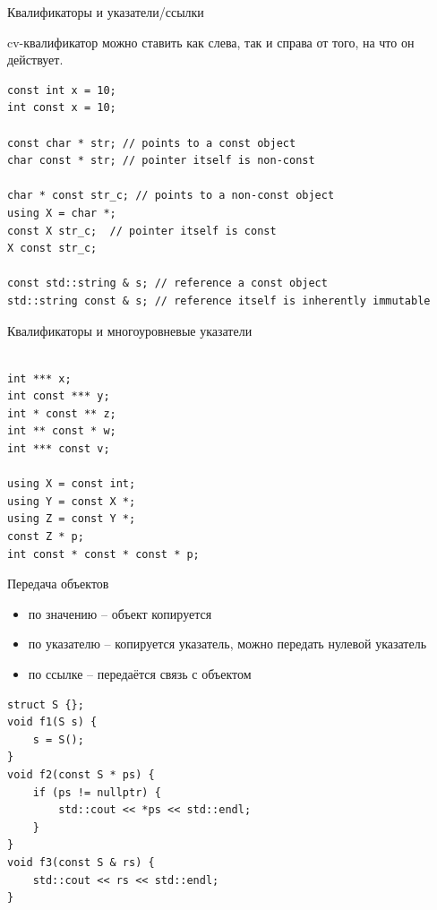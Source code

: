 \documentclass[unknownkeysallowed,xcolor=table]{beamer}
\begin{document}
\begin{frame}[fragile]{Квалификаторы и указатели/ссылки}

cv-квалификатор можно ставить как слева, так и справа от того, на что он действует.

\vspace{1em}

\begin{lstlisting}
const int x = 10;
int const x = 10;

const char * str; // points to a const object
char const * str; // pointer itself is non-const

char * const str_c; // points to a non-const object
using X = char *;
const X str_c;  // pointer itself is const
X const str_c;

const std::string & s; // reference a const object
std::string const & s; // reference itself is inherently immutable

\end{lstlisting}

\end{frame}

\begin{frame}[fragile]{Квалификаторы и многоуровневые указатели}

\begin{lstlisting}

int *** x;
int const *** y;
int * const ** z;
int ** const * w;
int *** const v;

using X = const int;
using Y = const X *;
using Z = const Y *;
const Z * p;
int const * const * const * p;

\end{lstlisting}

\end{frame}

\begin{frame}[fragile]{Передача объектов}

\begin{itemize}
  \item по значению -- объект копируется
  \item по указателю -- копируется указатель, можно передать нулевой указатель
  \item по ссылке -- передаётся связь с объектом
\end{itemize}

\begin{lstlisting}
struct S {};
void f1(S s) {
    s = S();
}
void f2(const S * ps) {
    if (ps != nullptr) {
        std::cout << *ps << std::endl;
    }
}
void f3(const S & rs) {
    std::cout << rs << std::endl;
}
\end{lstlisting}

\end{frame}
\end{document}
